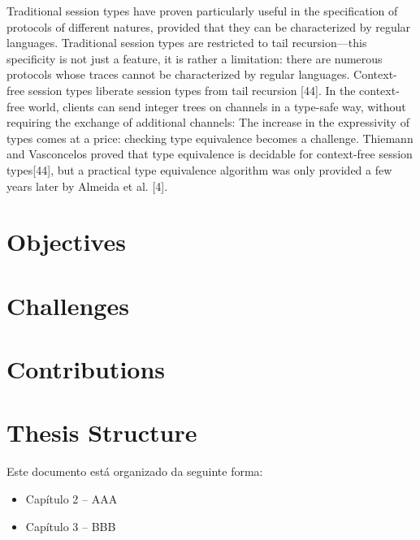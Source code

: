 Traditional session types have proven particularly useful in the specification of protocols of diﬀerent natures, provided that they
can be characterized by regular languages. Traditional session types are restricted to tail recursion—this specificity is not just a
feature, it is rather a limitation: there are numerous protocols whose traces cannot be characterized by regular languages. Context-
free session types liberate session types from tail recursion [44]. In the context-free world, clients can send integer trees on channels
in a type-safe way, without requiring the exchange of additional channels:
The increase in the expressivity of types comes at a price: checking
type equivalence becomes a challenge. Thiemann and Vasconcelos proved that type equivalence is decidable for context-free session
types[44], but a practical type equivalence algorithm was only provided a few years later by Almeida et al. [4].

\section{Objectives}


\section{Challenges}

\section{Contributions}

\section{Thesis Structure}

Este documento está organizado da seguinte forma:
\begin{itemize}
\item Capítulo 2 – AAA
\item Capítulo 3 – BBB
\end{itemize}

